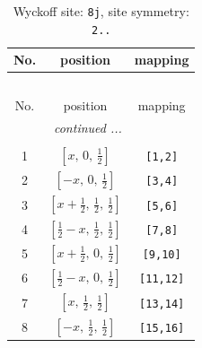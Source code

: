 \documentclass[fleqn,8pt]{jsarticle}
\begin{document}
\begin{longtable}{ccc}
\caption{Wyckoff site: {\tt 8j}, site symmetry: {\tt 2..}}
 \\
 \hline \hline
No. & position & mapping \\ \hline \endfirsthead

\multicolumn{2}{l}{\tablename\ \thetable{}} \\
 \hline \hline
No. & position & mapping \\ \hline \endhead

 \hline \hline
\multicolumn{2}{r}{\footnotesize\it continued ...} \\ \endfoot

 \hline \hline
\multicolumn{2}{r}{} \\ \endlastfoot

1 & $\left[ x,\, 0,\, \frac{1}{2} \right]$ & {\tt [1,2]} \\ \hline
2 & $\left[ - x,\, 0,\, \frac{1}{2} \right]$ & {\tt [3,4]} \\ \hline
3 & $\left[ x + \frac{1}{2},\, \frac{1}{2},\, \frac{1}{2} \right]$ & {\tt [5,6]} \\ \hline
4 & $\left[ \frac{1}{2} - x,\, \frac{1}{2},\, \frac{1}{2} \right]$ & {\tt [7,8]} \\ \hline
5 & $\left[ x + \frac{1}{2},\, 0,\, \frac{1}{2} \right]$ & {\tt [9,10]} \\ \hline
6 & $\left[ \frac{1}{2} - x,\, 0,\, \frac{1}{2} \right]$ & {\tt [11,12]} \\ \hline
7 & $\left[ x,\, \frac{1}{2},\, \frac{1}{2} \right]$ & {\tt [13,14]} \\ \hline
8 & $\left[ - x,\, \frac{1}{2},\, \frac{1}{2} \right]$ & {\tt [15,16]} \\
\end{longtable}
\renewcommand{\arraystretch}{1.2}
\end{document}
